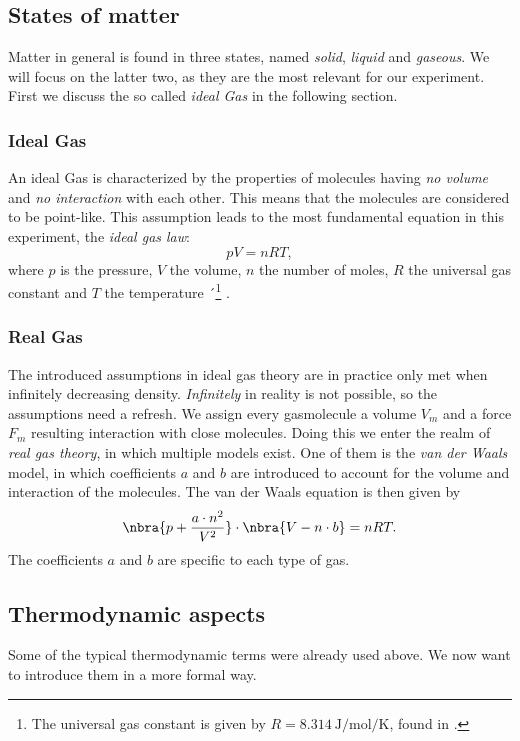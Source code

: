\documentclass{subfiles}
\begin{document}
    \subsection{States of matter}

        Matter in general is found in three states, named \emph{solid}, \emph{liquid} and \emph{gaseous}. We will focus on the latter two, as they are the most relevant for our experiment. First we discuss the so called \emph{ideal Gas} in the following section. 

        \subsubsection*{Ideal Gas}
            An ideal Gas is characterized by the properties of molecules having \emph{no volume} and \emph{no interaction} with each other. This means that the molecules are considered to be point-like. This assumption leads to the most fundamental equation in this experiment, the \emph{ideal gas law}:
            \[
                pV = nRT,
            \]
            where $p$ is the pressure, $V$ the volume, $n$ the number of moles, $R$ the universal gas constant and $T$ the temperature ´\footnote{The universal gas constant is given by $R = \SI{8.314}{\joule\per\mole\per\kelvin}$, found in \cite{nist:gasconstant}.} \cite[p.11]{nolting42}. 

        \subsubsection*{Real Gas}
            The introduced assumptions in ideal gas theory are in practice only met when infinitely decreasing density. \emph{Infinitely} in reality is not possible, so the assumptions need a refresh. We assign every gasmolecule a volume $V_m$ and a force $F_m$ resulting interaction with close molecules. Doing this we enter the realm of \emph{real gas theory}, in which multiple models exist. One of them is the \emph{van der Waals} model, in which coefficients $a$ and $b$ are introduced to account for the volume and interaction of the molecules. The van der Waals equation is then given by
            \[\nbra{p + \frac{a\cdot n^2}{V^2}} \cdot \nbra{V - n\cdot b} = nRT.\]
            The coefficients $a$ and $b$ are specific to each type of gas. \cite[p.13]{nolting42}
    
    \subsection{Thermodynamic aspects}
        Some of the typical thermodynamic terms were already used above. We now want to introduce them in a more formal way.
\end{document}
